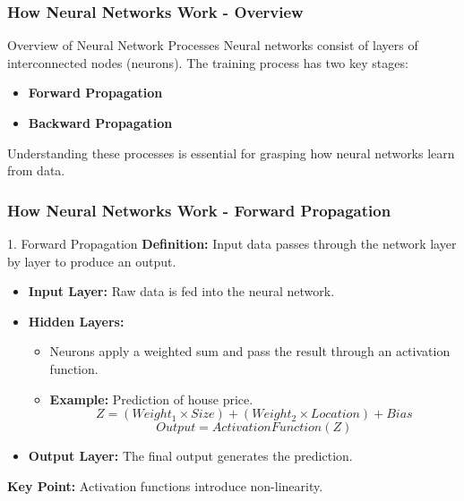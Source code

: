 \documentclass[aspectratio=169]{beamer}
\begin{document}
\begin{frame}[fragile]
    \frametitle{How Neural Networks Work - Overview}
    \begin{block}{Overview of Neural Network Processes}
        Neural networks consist of layers of interconnected nodes (neurons). 
        The training process has two key stages:
        \begin{itemize}
            \item \textbf{Forward Propagation}
            \item \textbf{Backward Propagation}
        \end{itemize}
        Understanding these processes is essential for grasping how neural networks learn from data.
    \end{block}
\end{frame}

\begin{frame}[fragile]
    \frametitle{How Neural Networks Work - Forward Propagation}
    \begin{block}{1. Forward Propagation}
        \textbf{Definition:} Input data passes through the network layer by layer to produce an output.
        \begin{itemize}
            \item \textbf{Input Layer:} Raw data is fed into the neural network.
            \item \textbf{Hidden Layers:}
            \begin{itemize}
                \item Neurons apply a weighted sum and pass the result through an activation function.
                \item \textbf{Example:} Prediction of house price.
                \begin{equation}
                    Z = (Weight_1 \times Size) + (Weight_2 \times Location) + Bias
                \end{equation}
                \begin{equation}
                    Output = ActivationFunction(Z)
                \end{equation}
            \end{itemize}
            \item \textbf{Output Layer:} The final output generates the prediction.
        \end{itemize}
        \textbf{Key Point:} Activation functions introduce non-linearity.
    \end{block}
\end{frame}
\end{document}
